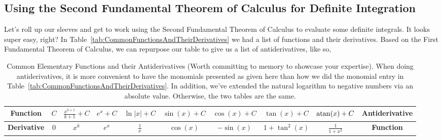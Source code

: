 \subsection{Using the Second Fundamental Theorem of Calculus for Definite Integration}

    Let's roll up our sleeves and get to work using the Second Fundamental Theorem of Calculus to evaluate some definite integrals. It looks super easy, right? In Table~\ref{tab:CommonFunctionsAndTheirDerivatives} we had a list of functions and their derivatives. Based on the First Fundamental Theorem of Calculus, we can repurpose our table to give us a list of antiderivatives, like so,

    \bigskip

\renewcommand{\arraystretch}{1.5}
\begin{table}[htb]
\centering
\begin{tabular}{|c |c|c|c|c|c|c|c|c|c  |}
\hline
{\bf Function} & $C$ & $\frac{x^{k+1}}{k+1}+C $ & $e^x +C$ & $\ln|x| +C$ & $\sin(x)+C$ & $\cos(x)+C$ & $\tan(x)+C$ & $\mathrm{atan}(x)+C$ & {\bf Antiderivative}\\
\hline
{\bf Derivative} & $0$ & $x^k$ & $e^x$ & $\frac{1}{x}$ & $\cos(x)$ & $-\sin(x)$ & $1 + \tan^2(x)$ & $\frac{1}{1 + x^2}$ & {\bf Function}\\
\hline
\end{tabular}
\caption{Common Elementary Functions and their Antiderivatives (Worth committing to memory to showcase your expertise). When doing antiderivatives, it is more convenient to have the monomials presented as given here than how we did the monomial entry in Table~\ref{tab:CommonFunctionsAndTheirDerivatives}. In addition, we've extended the natural logarithm to negative numbers via an absolute value. Otherwise, the two tables are the same.}
\label{tab:CommonFunctionsAndTheirAntiderivatives}
\end{table}

